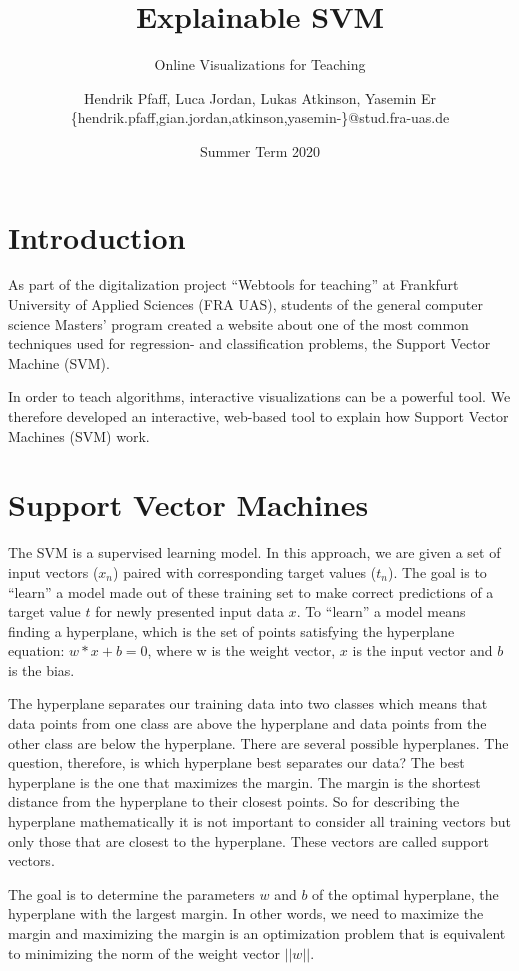 \documentclass{scrartcl}
\title{Explainable SVM}
\subtitle{Online Visualizations for Teaching}
\author{
  Hendrik Pfaff, Luca Jordan, Lukas Atkinson, Yasemin Er
  \\
  {\normalsize\ttfamily \{hendrik.pfaff,gian.jordan,atkinson,yasemin-\}@stud.fra-uas.de}
}
\date{Summer Term 2020}
\begin{document}
\maketitle

\section{Introduction}
As part of the digitalization project “Webtools for teaching” at Frankfurt University of Applied Sciences (FRA UAS), students of the general computer science Masters’ program created a website about one of the most common techniques used for regression- and classification problems, the Support Vector Machine (SVM). 

In order to teach algorithms, interactive visualizations can be a powerful tool.
We therefore developed an interactive, web-based tool
to explain how Support Vector Machines (SVM) work.

\section{Support Vector Machines}
The SVM is a supervised learning model. In this approach, we are given a set of input vectors ($x_n$) paired with corresponding target values ($t_n$). 
The goal is to “learn” a model made out of these training set to make correct predictions of a target value $t$ for newly presented input data $x$. 
To “learn” a model means finding a hyperplane,
which is the set of points satisfying the hyperplane equation: $w*x+b = 0$,
where w is the weight vector, $x$ is the input vector and $b$ is the bias.

The hyperplane separates our training data into two classes which means that data points from one class are above the hyperplane and data points from the other class are below the hyperplane. 
There are several possible hyperplanes. The question, therefore, is which hyperplane best separates our data? The best hyperplane is the one that maximizes the margin. The margin is the shortest distance from the hyperplane to their closest points. 
So for describing the hyperplane mathematically it is not important to consider all training vectors but only those that are closest to the hyperplane. These vectors are called support vectors. 

The goal is to determine the parameters $w$ and $b$ of the optimal hyperplane, the hyperplane with the largest margin. In other words, we need to maximize the margin and maximizing the margin is an optimization problem that is equivalent to minimizing the norm of the weight vector $||w||$. 
\end{document}

